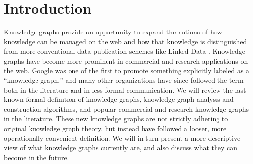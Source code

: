 \section{Introduction}


Knowledge graphs provide an opportunity to expand the notions of how knowledge can be managed on the web and how that knowledge is distinguished from more conventional data publication schemes like Linked Data \cite{bizer2009linked}.
Knowledge graphs have become more prominent in commercial and research applications on the web.
Google was one of the first to promote something explicitly labeled as a ``knowledge graph,'' \cite{singhal2012introducing} and many other organizations have since followed the term both in the literature and in less formal communication.
We will review the last known formal definition of knowledge graphs, knowledge graph analysis and construction algorithms, and popular commercial and research knowledge graphs in the literature.
These new knowledge graphs are not strictly adhering to original knowledge graph theory, but instead have followed a looser, more operationally convenient definition.
We will in turn present a more descriptive view of what knowledge graphs currently are, and also discuss what they can become in the future.